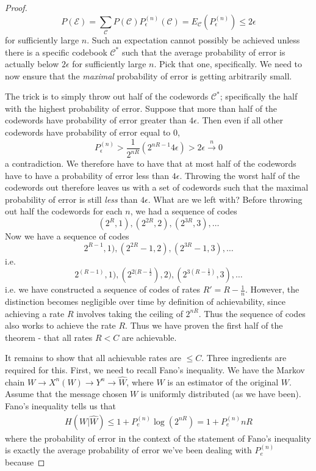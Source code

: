 \begin{proof}
\[P(\mathcal{E}) = \sum_{\mathcal{C}}P(\mathcal{C})P_{\epsilon}^{(n)}(\mathcal{C}) = E_{\mathcal{C}}( P_{\epsilon}^{(n)} ) \leq 2\epsilon \]
for sufficiently large $n$. Such an expectation cannot possibly be achieved unless there is a specific codebook $\mathcal{C}^*$ such that the average probability of error is actually below $2\epsilon$ for sufficiently large $n$. Pick that one, specifically. We need to now ensure that the \emph{maximal} probability of error is getting arbitrarily small. \par 
 The trick is to simply throw out half of the codewords $\mathcal{C}^*$; specifically the half with the highest probability of error. Suppose that more than half of the codewords have probability of error greater than $4\epsilon$. Then even if all other codewords have probability of error equal to $0$,
 \[ P_{\epsilon}^{(n)} > \frac{1}{2^{nR}}(2^{nR-1}4\epsilon) > 2\epsilon \overset{n}{\to} 0 \]
 a contradiction. We therefore have to have that at most half of the codewords have to have a probability of error less than $4\epsilon$. Throwing the worst half of the codewords out therefore leaves us with a set of codewords such that the maximal probability of error is still \emph{less} than $4\epsilon$. What are we left with? Before throwing out half the codewords for each $n$, we had a sequence of codes 
 \[ (2^R,1),(2^{2R},2),(2^{3R},3),\ldots \]
 Now we have a sequence of codes
 \[ 2^{R-1},1),(2^{2R}-1,2),(2^{3R}-1,3),\ldots \]
 i.e.
 \[ 2^{(R-1)},1),(2^{2(R-\frac{1}{2}}),2),(2^{3(R-\frac{1}{3})},3),\ldots \]
 i.e. we have constructed a sequence of codes of rates $R' = R-\frac{1}{n}$. However, the distinction becomes negligible over time by definition of achievability, since achieving a rate $R$ involves taking the ceiling of $2^{nR}$. Thus the sequence of codes also works to achieve the rate $R$. Thus we have proven the first half of the theorem - that all rates $R < C$ are achievable. \par 
 It remains to show that all achievable rates are $\leq C$. Three ingredients are required for this. First, we need to recall Fano's inequality. We have the Markov chain $W \to X^n(W) \to Y^n \to \hat{W}$, where $\hat{W}$ is an estimator of the original $W$. Assume that the message chosen $W$ is uniformly distributed (as we have been). Fano's inequality tells us that
 \begin{align}
	H(W|\hat{W}) \leq 1+P_e^{(n)}\log(2^{nR}) = 1+P_e^{(n)}nR
 \end{align}
 where the probability of error in the context of the statement of Fano's inequality is exactly the average probability of error we've been dealing with $P_e^{(n)}$ because

\end{proof}
